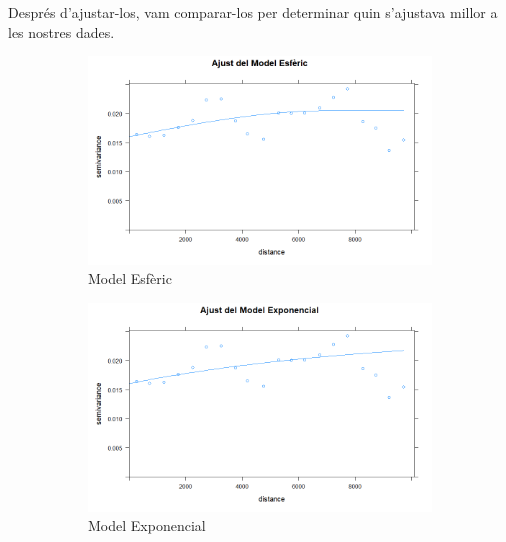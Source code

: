 Després d'ajustar-los, vam comparar-los per determinar quin s'ajustava millor a les nostres dades.

\begin{figure}[ht]
    \centering
    \begin{subfigure}[b]{0.32\textwidth}
        \centering
        \includegraphics[width=\textwidth]{Images/7_Geospatial/2_modeling/model_esferic.png}
        \caption{Model Esfèric}
        \label{fig:esferic}
    \end{subfigure}
    \hfill
    \begin{subfigure}[b]{0.32\textwidth}
        \centering
        \includegraphics[width=\textwidth]{Images/7_Geospatial/2_modeling/model_exponencial.png}
        \caption{Model Exponencial}
        \label{fig:exponencial}
    \end{subfigure}
    \hfill
    \begin{subfigure}[b]{0.32\textwidth}
        \centering

\end{subfigure}
\end{figure}
